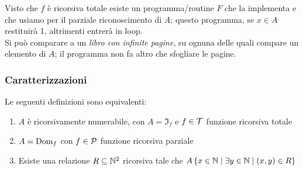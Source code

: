 Visto che $f$ è ricorsiva totale esiste un programma/routine $F$ che la implementa e che usiamo per il parziale riconoscimento di $A$: questo programma, se $x \in A$ restituirà 1, altrimenti entrerà in loop.\\

Si può comparare a un \textit{libro con infinite pagine}, su ognuna delle quali compare un elemento di $A$; il programma non fa altro che sfogliare le pagine.\\

\subsubsection{Caratterizzazioni}

\begin{theor}
	Le seguenti definizioni sono equivalenti:
	\begin{enumerate}
		\item $A$ è ricorsivamente numerabile, con $A = \Im_f$ e $f \in \mathcal{T}$ funzione ricorsiva totale
		\item $A = \text{Dom}_f$ con $f \in \mathcal{P}$ funzione ricorsiva parziale
		\item Esiste una relazione $R \subseteq \mathbb{N}^2$ ricorsiva tale che $A \left\{x \in \mathbb{N} \mid \exists y \in \mathbb{N} \mid (x,y) \in R \right\}$
	\end{enumerate}
\end{theor}

